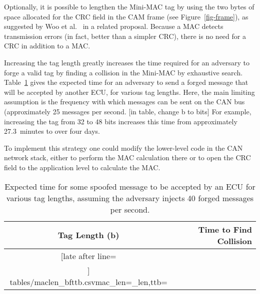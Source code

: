 Optionally, it is possible to lengthen the Mini-MAC tag by 
using the two bytes of space allocated for the CRC field in the CAM frame (see Figure~\ref{fig-frame}),
as suggested by Woo et al.~\cite{Woo-14} in a related proposal.
Because a MAC detects transmission errors (in fact, better than a simpler CRC), there is no need for
a CRC in addition to a MAC.  

Increasing the tag length greatly increases the time required for an adversary to forge a valid tag by
finding a collision in the Mini-MAC by exhaustive search.  
Table~\ref{tab-taglength} gives the expected time for an adversary to send a forged message 
that will be accepted by another ECU, for various tag lengths.  Here, the main limiting assumption is 
the frequency with which messages can be sent on the CAN bus 
(approximately 25 messages per second. [in table, change b to bits]
For example, increasing the tag from 32 to 48 bits increases this time from
approximately 27.3~minutes to over four days.


To implement this strategy one could modify the lower-level code in the CAN network stack, 
either to perform the MAC calculation there 
or to open the CRC field to the application level to calculate the MAC.


	\begin{table}	
	\centering
	\caption{Expected time for some spoofed message to be accepted by an ECU for various tag lengths, 
	assuming the adversary injects 40 forged messages per second.}
	\label{tab-taglength}
	\vspace{8pt}
	\begin{tabular}{c|r}%
	\bfseries Tag Length (b) & \bfseries Time to Find Collision\\\hline \csvreader[late after line=\\]%
		{tables/maclen_bfttb.csv}{mac_len=\mac_len,ttb=\ttb}%
		{\mac_len & \ttb}%
	\end{tabular}
	\end{table}
	
